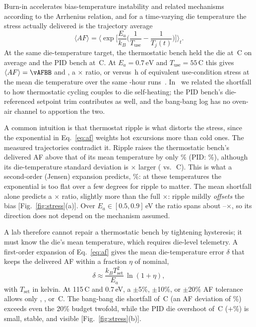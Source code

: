 \documentclass[10pt,twocolumn]{article}
\newcommand{\degC}{\,\textdegree C}
\newcommand{\unit}[1]{\,\mathrm{#1}}
\begin{document}
Burn-in accelerates bias-temperature instability and related mechanisms according to the Arrhenius relation, and for a time-varying die temperature the stress actually delivered is the trajectory average
\begin{equation}
\langle AF\rangle=\Big\langle \exp\!\Big[\frac{E_a}{k_B}\Big(\frac{1}{T_{\mathrm{use}}}-\frac{1}{T_j(t)}\Big)\Big]\Big\rangle_t .
\label{eq:af}
\end{equation}
At the same die-temperature target, the thermostatic bench held the die at \vTBB\degC{} on average and the PID bench at \vTPID\degC. At $E_a=0.7\unit{eV}$ and $T_{\mathrm{use}}=55$\degC{} this gives $\langle AF\rangle=\vAFBB$ and \vAFPID, a \vAFratio$\times$ ratio, or \vEqhBB{} versus \vEqhPID\,h of equivalent use-condition stress at the mean die temperature over the same \vDurPair-hour runs~\cite{sbcci26}. In~\cite{sbcci26} we related the shortfall to how thermostatic cycling couples to die self-heating; the PID bench's die-referenced setpoint trim contributes as well, and the bang-bang log has no oven-air channel to apportion the two.

A common intuition is that thermostat ripple is what distorts the stress, since the exponential in Eq.~\eqref{eq:af} weights hot excursions more than cold ones. The measured trajectories contradict it. Ripple raises the thermostatic bench's delivered AF above that of its mean temperature by only \vRippleBB\% (PID: \vRipplePID\%), although its die-temperature standard deviation is \vTsdRatio$\times$ larger (\vTsdBB{} vs.\ \vTsdPID\degC). This is what a second-order (Jensen) expansion predicts, \vJensen\%: at these temperatures the exponential is too flat over a few degrees for ripple to matter. The mean shortfall alone predicts a \vAFratioMeanOnly$\times$ ratio, slightly more than the full \vAFratio$\times$: ripple mildly \emph{offsets} the bias [Fig.~\ref{fig:stress}(a)]. Over $E_a\in[0.5,0.9]$\,eV the ratio spans about \vAFratioLoOne--\vAFratioHiOne$\times$, so its direction does not depend on the mechanism assumed.

A lab therefore cannot repair a thermostatic bench by tightening hysteresis; it must know the die's mean temperature, which requires die-level telemetry. A first-order expansion of Eq.~\eqref{eq:af} gives the mean die-temperature error $\delta$ that keeps the delivered AF within a fraction $\eta$ of nominal,
\begin{equation}
\delta\approx\frac{k_B T_{\mathrm{set}}^2}{E_a}\,\ln(1+\eta),
\label{eq:delta}
\end{equation}
with $T_{\mathrm{set}}$ in kelvin. At 115\degC{} and 0.7\,eV, a $\pm$5\%, $\pm$10\%, or $\pm$20\% AF tolerance allows only \vDeltaFive, \vDeltaTen, or \vDeltaTwenty\degC. The bang-bang die shortfall of \vTerrBB\degC{} (an AF deviation of \vAFdevBB\%) exceeds even the 20\% budget twofold, while the PID die overshoot of \vTerrPID\degC{} ($+$\vAFdevPID\%) is small, stable, and visible [Fig.~\ref{fig:stress}(b)].
\end{document}
